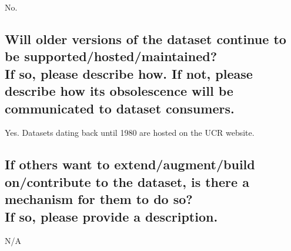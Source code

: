 \documentclass[letterpaper, 10 pt, conference]{ieeeconf}  %
\newcommand{\subtitle}[1]{{\\ \small \normalfont \color{purple} #1}}
\begin{document}
No.

\subsection{Will older versions of the dataset continue to be supported/hosted/maintained? \subtitle{If so, please describe how. If not, please describe how its obsolescence will be communicated to dataset consumers. }}

Yes. Datasets dating back until 1980 are hosted on the UCR website.

\subsection{If others want to extend/augment/build on/contribute to the dataset, is there a mechanism for them to do so? \subtitle{If so, please provide a description.}}

N/A

\medskip
 
  

\end{document}
